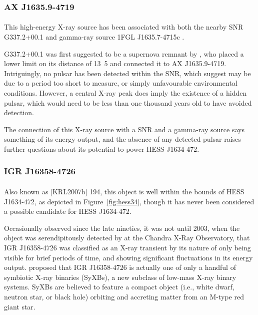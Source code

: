 \documentclass[a4paper, titlepage, oneside]{article}
\newcommand{\parsec}{\mathrm{pc}}
\begin{document}
\begin{multicols}{2}
\subsubsection{AX J1635.9-4719}
\paragraph{}
This high-energy X-ray source has been associated with both the nearby SNR G337.2+00.1 and gamma-ray source 1FGL J1635.7-4715c \parencites{Anderson:2014}{Abdo:2010}.

G337.2+00.1 was first suggested to be a supernova remnant by \textcite{Combi:2005}, who placed a lower limit on its distance of \unit{13.5}{\kilo\parsec} and connected it to AX J1635.9-4719. Intriguingly, no pulsar has been detected within the SNR, which \textcite{Combi:2006} suggest may be due to a period too short to measure, or simply unfavourable environmental conditions. However, a central X-ray peak does imply the existence of a hidden pulsar, which would need to be less than one thousand years old to have avoided detection.

The connection of this X-ray source with a SNR and a gamma-ray source says something of its energy output, and the absence of any detected pulsar raises further questions about its potential to power HESS J1634-472.

\subsubsection{IGR J16358-4726}
\paragraph{}
Also known as [KRL2007b] 194, this object is well within the bounds of HESS J1634-472, as depicted in Figure~\ref{fig:hess34}, though it has never been considered a possible candidate for HESS J1634-472.

Occasionally observed since the late nineties, it was not until 2003, when the object was serendipitously detected by \textcite{Patel:2004} at the Chandra X-Ray Observatory, that IGR J16358-4726 was classified as an X-ray transient by its nature of only being visible for brief periods of time, and showing significant fluctuations in its energy output. \textcite{Nespoli:2010} proposed that IGR J16358-4726 is actually one of only a handful of symbiotic X-ray binaries (SyXBs), a new subclass of low-mass X-ray binary systems. SyXBs are believed to feature a compact object (i.e., white dwarf, neutron star, or black hole) orbiting and accreting matter from an M-type red giant star.


\end{multicols}
\end{document}
